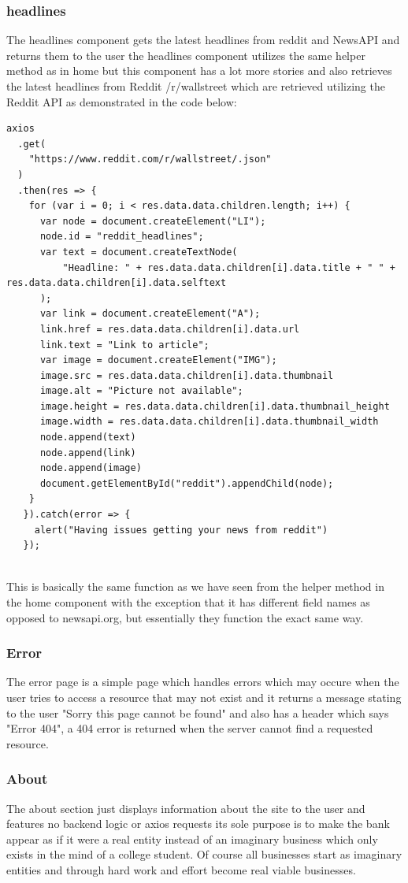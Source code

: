 \subsubsection{headlines}
The headlines component gets the latest headlines from reddit and NewsAPI and returns them to the user
the headlines component utilizes the same helper method as in home but this component has a lot more
stories and also retrieves the latest headlines from Reddit /r/wallstreet which are retrieved utilizing
the Reddit API as demonstrated in the code below:
\begin{verbatim}
axios
  .get(
    "https://www.reddit.com/r/wallstreet/.json"
  )
  .then(res => {
    for (var i = 0; i < res.data.data.children.length; i++) {
      var node = document.createElement("LI");
      node.id = "reddit_headlines";
      var text = document.createTextNode(
          "Headline: " + res.data.data.children[i].data.title + " " + res.data.data.children[i].data.selftext
      );
      var link = document.createElement("A");
      link.href = res.data.data.children[i].data.url
      link.text = "Link to article";
      var image = document.createElement("IMG");
      image.src = res.data.data.children[i].data.thumbnail
      image.alt = "Picture not available";
      image.height = res.data.data.children[i].data.thumbnail_height
      image.width = res.data.data.children[i].data.thumbnail_width
      node.append(text)
      node.append(link)
      node.append(image)
      document.getElementById("reddit").appendChild(node);
    }
   }).catch(error => {
     alert("Having issues getting your news from reddit")
   });
\end{verbatim}
\\
This is basically the same function as we have seen from the helper method in the home component with the
exception that it has different field names as opposed to newsapi.org, but essentially they function the
exact same way.
\subsubsection{Error}
The error page is a simple page which handles errors which may occure when the user tries to
access a resource that may not exist and it returns a message stating to the user "Sorry this page cannot be found"
and also has a header which says "Error 404", a 404 error is returned when the server cannot find a requested resource.
\subsubsection{About}
The about section just displays information about the site to the user and features no backend logic or axios requests
its sole purpose is to make the bank appear as if it were a real entity instead of an imaginary business which only
exists in the mind of a college student.  Of course all businesses start as imaginary entities and through hard work
and effort become real viable businesses.
